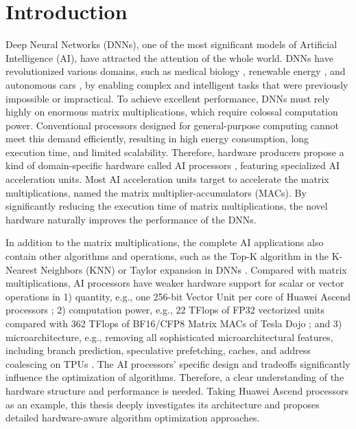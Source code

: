 \chapter{Introduction}
\label{chp_1_introduction}

Deep Neural Networks (DNNs), one of the most significant models of Artificial Intelligence (AI), have attracted the attention of the whole world. DNNs have revolutionized various domains, such as medical biology \cite{zitnik2019machine}, renewable energy \cite{gensler2016deep}, and autonomous cars \cite{tian2018deeptest}, by enabling complex and intelligent tasks that were previously impossible or impractical. To achieve excellent performance, DNNs must rely highly on enormous matrix multiplications, which require colossal computation power. Conventional processors designed for general-purpose computing cannot meet this demand efficiently, resulting in high energy consumption, long execution time, and limited scalability. Therefore, hardware producers propose a kind of domain-specific hardware called AI processors \cite{Dojo, DBLP:conf/isca/JouppiK0MNNPSST23, Mi300, H100, DBLP:conf/isscc/OuyangDML21, DBLP:conf/hotchips/LiaoTXZ19, 910}, featuring specialized AI acceleration units. Most AI acceleration units target to accelerate the matrix multiplications, named the matrix multiplier-accumulators (MACs). By significantly reducing the execution time of matrix multiplications, the novel hardware naturally improves the performance of the DNNs. 

In addition to the matrix multiplications, the complete AI applications also contain other algorithms and operations, such as the Top-K algorithm in the K-Nearest Neighbors (KNN) \cite{1053964} or Taylor expansion in DNNs \cite{DBLP:conf/cvpr/JinYWMH23}. Compared with matrix multiplications, AI processors have weaker hardware support for scalar or vector operations in 1) quantity, e.g., one 256-bit Vector Unit per core of Huawei Ascend processors \cite{DBLP:conf/hotchips/LiaoTXZ19}; 2) computation power, e.g., 22 TFlops of FP32 vectorized units compared with 362 TFlops of BF16/CFP8 Matrix MACs of Tesla Dojo \cite{Dojo}; and 3) microarchitecture, e.g., removing all sophisticated microarchitectural features, including branch prediction, speculative prefetching, caches, and address coalescing on TPUs \cite{DBLP:conf/isca/JouppiYPPABBBBB17}. The AI processors' specific design and tradeoffs significantly influence the optimization of algorithms. Therefore, a clear understanding of the hardware structure and performance is needed. Taking Huawei Ascend processors \cite{DBLP:conf/hotchips/LiaoTXZ19} as an example, this thesis deeply investigates its architecture and proposes detailed hardware-aware algorithm optimization approaches.

